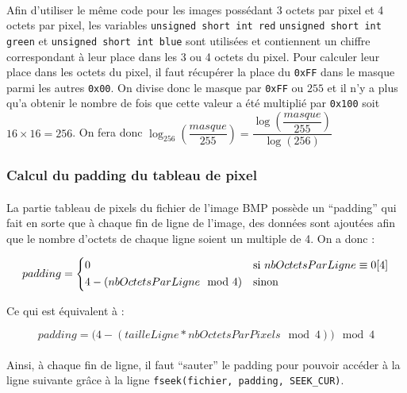 \documentclass{report}
\begin{document}
\paragraph{} Afin d'utiliser le même code pour les images possédant 3 octets
par pixel et 4 octets par pixel, les variables
\lstinline[style=prog]|unsigned short int red|
\lstinline[style=prog]|unsigned short int green| et
\lstinline[style=prog]|unsigned short int blue| sont utilisées et contiennent
un chiffre correspondant à leur place dans les 3 ou 4 octets du pixel. Pour
calculer leur place dans les octets du pixel, il faut récupérer la place du
\texttt{0xFF} dans le masque parmi les autres \texttt{0x00}. On divise donc le
masque par \texttt{0xFF} ou $255$ et il n'y a plus qu'a obtenir le nombre de
fois que cette valeur a été multiplié par \texttt{0x100} soit $16\times16=256$.
On fera donc $\log_{256}\left(\dfrac{masque}{255}\right) =
\dfrac{\log\left(\dfrac{masque}{255}\right)}{\log\left(256\right)}$

\subsubsection{Calcul du padding du tableau de pixel}

\paragraph{} La partie tableau de pixels du fichier de l'image BMP possède un
``padding'' qui fait en sorte que à chaque fin de ligne de l'image, des données
sont ajoutées afin que le nombre d'octets de chaque ligne soient un multiple de
4. On a donc :

\begin{equation}
		padding =	\begin{dcases*}
						0 & si $nbOctetsParLigne \equiv 0[4]$\\
						4 - (nbOctetsParLigne \mod 4) & sinon
					\end{dcases*}
\end{equation}

Ce qui est équivalent à :

\begin{equation}
	padding = \big(4 - (tailleLigne * nbOctetsParPixels \mod 4)\big) \mod 4
\end{equation}

\paragraph{} Ainsi, à chaque fin de ligne, il faut ``sauter'' le padding pour
pouvoir accéder à la ligne suivante grâce à la ligne
\lstinline[style=prog]|fseek(fichier, padding, SEEK_CUR)|.
\end{document}
